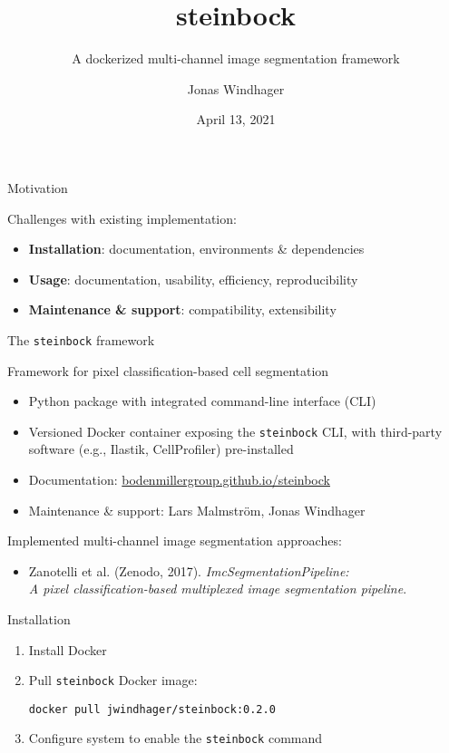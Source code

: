 \documentclass[[aspectratio=169]{beamer}
\title{steinbock}
\subtitle{A dockerized multi-channel image segmentation framework}
\date{April 13, 2021}
\author{Jonas Windhager}
\begin{document}
\begin{frame}
\titlepage
\end{frame}


\begin{frame}{Motivation}
	
	Challenges with existing implementation:
	\begin{itemize}
		\item \textbf{Installation}: documentation, environments \& dependencies
		\item \textbf{Usage}: documentation, usability, efficiency, reproducibility
		\item \textbf{Maintenance \& support}: compatibility, extensibility
	\end{itemize}

\end{frame}


\begin{frame}{The \texttt{steinbock} framework}
	
	Framework for pixel classification-based cell segmentation
	\begin{itemize}
		\item Python package with integrated command-line interface (CLI)
		\item Versioned Docker container exposing the \texttt{steinbock} CLI, with third-party software (e.g., Ilastik, CellProfiler) pre-installed
		\item Documentation: \href{https://bodenmillergroup.github.io/steinbock}{bodenmillergroup.github.io/steinbock}
		\item Maintenance \& support: Lars Malmström, Jonas Windhager
	\end{itemize}

	\bigskip

	Implemented multi-channel image segmentation approaches:
	\begin{itemize}
		\item \small Zanotelli et al. (Zenodo, 2017). \textit{ImcSegmentationPipeline: \\ A pixel classification-based multiplexed image segmentation pipeline}.
	\end{itemize}
	
\end{frame}


\begin{frame}[fragile]{Installation}

\begin{enumerate}
	\item Install Docker
	\bigskip
	\item Pull \texttt{steinbock} Docker image:\\
\begin{verbatim}
docker pull jwindhager/steinbock:0.2.0
\end{verbatim}
	\bigskip
	\item Configure system to enable the \texttt{steinbock} command
\end{enumerate}

\end{frame}
\end{document}
